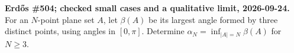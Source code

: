 \textbf{Erd\H{o}s \#504; checked small cases and a qualitative limit, 2026-09-24.}
For an $N$-point plane set $A$, let $\beta(A)$ be its largest angle formed by three distinct points, using angles in $[0,\pi]$. Determine
$\alpha_N=\inf_{|A|=N}\beta(A)$ for $N\geq3$.
